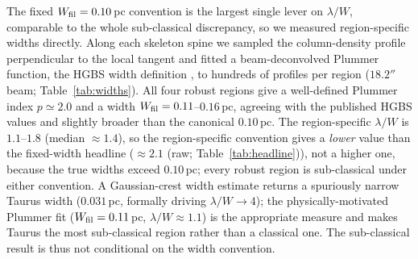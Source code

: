 \documentclass[usenatbib,twoside,twocolumn]{mnras}
\begin{document}
The fixed $W_{\rm fil}=0.10$\,pc convention is the largest single lever on $\lambda/W$, comparable to the whole sub-classical discrepancy, so we measured region-specific widths directly. Along each skeleton spine we sampled the column-density profile perpendicular to the local tangent and fitted a beam-deconvolved Plummer function, the HGBS width definition \citep{Arzoumanian2019}, to hundreds of profiles per region ($18.2''$ beam; Table~\ref{tab:widths}). All four robust regions give a well-defined Plummer index $p\simeq2.0$ and a width $W_{\rm fil}=0.11$--$0.16$\,pc, agreeing with the published HGBS values \citep{Arzoumanian2019} and slightly broader than the canonical $0.10$\,pc. The region-specific $\lambda/W$ is $1.1$--$1.8$ (median $\approx1.4$), so the region-specific convention gives a \emph{lower} value than the fixed-width headline ($\approx2.1$ (raw; Table~\ref{tab:headline})), not a higher one, because the true widths exceed $0.10$\,pc; every robust region is sub-classical under either convention. A Gaussian-crest width estimate returns a spuriously narrow Taurus width ($0.031$\,pc, formally driving $\lambda/W\to4$); the physically-motivated Plummer fit ($W_{\rm fil}=0.11$\,pc, $\lambda/W\approx1.1$) is the appropriate measure and makes Taurus the most sub-classical region rather than a classical one. The sub-classical result is thus not conditional on the width convention.
\end{document}
